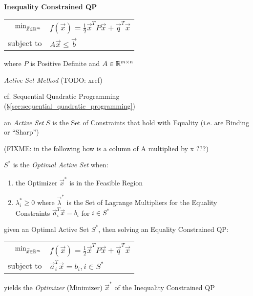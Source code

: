 \textbf{Inequality Constrained QP}

\begin{tabular}{r l}
  $\mathrm{min}_{\vec{\vec{x}} \in \mathbb{R}^m}$ &
    $f(\vec{x}) = \frac{1}{2}\vec{x}^T P\vec{x} + \vec{q}^T\vec{x}$ \\
  subject to & $A\vec{x} \leq \vec{b}$ \\
\end{tabular}

where $P$ is Positive Definite and $A \in \mathbb{R}^{m \times n}$


\emph{Active Set Method} (TODO: xref)

cf. Sequential Quadratic Programming
(\S\ref{sec:sequential_quadratic_programming})

an \emph{Active Set} $S$ is the Set of Constraints that hold with Equality
(i.e. are Binding or ``Sharp'')

(FIXME: in the following how is a column of A multiplied by x ???)

$S^*$ is the \emph{Optimal Active Set} when:
\begin{enumerate}
  \item the Optimizer $\vec{x}^*$ is in the Feasible Region
  \item $\lambda^*_i \geq 0$ where $\vec{\lambda}^*$ is the Set of Lagrange
    Multipliers for the Equality Constraints $\vec{a}_i^T\vec{x} = b_i$ for $i
    \in S^*$
\end{enumerate}

given an Optimal Active Set $S^*$, then solving an Equality Constrained QP:

\begin{tabular}{r l}
  $\mathrm{min}_{\vec{\vec{x}} \in \mathbb{R}^m}$ &
    $f(\vec{x}) = \frac{1}{2}\vec{x}^T P\vec{x} + \vec{q}^T\vec{x}$ \\
  subject to & $\vec{a}_i^T\vec{x} = b_i, i \in S^*$ \\
\end{tabular}

yields the \emph{Optimizer} (Minimizer) $\vec{x}^*$ of the Inequality
Constrained QP

